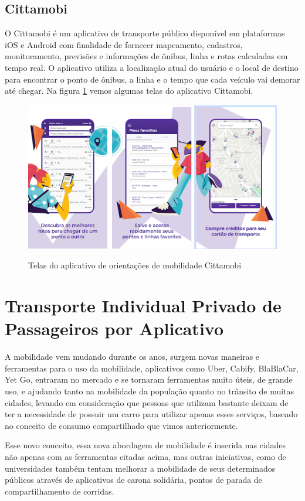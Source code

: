 \subsection{Cittamobi}
O Cittamobi é um aplicativo de transporte público disponível em plataformas iOS e Android com finalidade de fornecer mapeamento, cadastros, monitoramento, previsões e informações de ônibus, linha e rotas calculadas em tempo real. O aplicativo utiliza a localização atual do usuário e o local de destino para encontrar o ponto de ônibus, a linha e o tempo que cada veículo vai demorar até chegar. Na figura \ref{fig:cittamobi} vemos algumas telas do aplicativo Cittamobi.

\begin{figure}[!hbtp]
	\centering
	\caption{Telas do aplicativo de orientações de mobilidade Cittamobi}
	\includegraphics[width=0.4	\textwidth]{./04-figuras/cittamobi/cittamobi.png}
	\label{fig:cittamobi}
\end{figure}




\section{Transporte Individual Privado de Passageiros por Aplicativo}

A mobilidade vem mudando durante os anos, surgem novas maneiras e ferramentas para o uso da mobilidade, aplicativos como Uber, Cabify, BlaBlaCar, Yet Go, entraram no mercado e se tornaram ferramentas muito úteis, de grande uso, e ajudando tanto na mobilidade da população quanto no trânsito de muitas cidades, levando em consideração que pessoas que utilizam bastante deixam de ter a necessidade de possuir um carro para utilizar apenas esses serviços, baseado no conceito de consumo compartilhado que vimos anteriormente.

Esse novo conceito, essa nova abordagem de mobilidade é inserida nas cidades não apenas com as ferramentas citadas acima, mas outras iniciativas, como de universidades também tentam melhorar a mobilidade de seus determinados públicos através de aplicativos de carona solidária, pontos de parada de compartilhamento de corridas.

